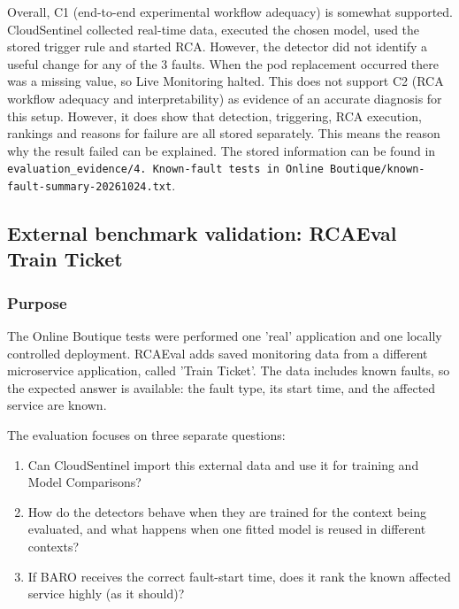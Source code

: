 Overall, C1 (end-to-end experimental workflow adequacy) is somewhat supported. CloudSentinel collected real-time data, executed the chosen model, used the stored trigger rule and started RCA. However, the detector did not identify a useful change for any of the 3 faults. When the pod replacement occurred there was a missing value, so Live Monitoring halted. This does not support C2 (RCA workflow adequacy and interpretability) as evidence of an accurate diagnosis for this setup. However, it does show that detection, triggering, RCA execution, rankings and reasons for failure are all stored separately. This means the reason why the result failed can be explained. The stored information can be found in \texttt{evaluation\_evidence/4. Known-fault tests in Online Boutique/known-fault-summary-20261024.txt}.

\subsection{External benchmark validation: RCAEval Train Ticket}

\subsubsection{Purpose}

The Online Boutique tests were performed one 'real' application and one locally controlled deployment. RCAEval adds saved monitoring data from a different microservice application, called 'Train Ticket'. The data includes known faults, so the expected answer is available: the fault type, its start time, and the affected service are known.

The evaluation focuses on three separate questions:
\begin{enumerate}
    \item Can CloudSentinel import this external data and use it for training and Model Comparisons?
    \item How do the detectors behave when they are trained for the context being evaluated, and what happens when one fitted model is reused in different contexts?
    \item If BARO receives the correct fault-start time, does it rank the known affected service highly (as it should)?
\end{enumerate}

